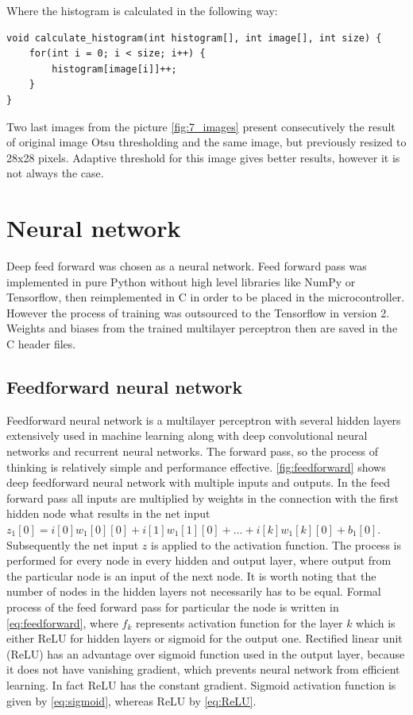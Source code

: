 Where the histogram is calculated in the following way:
\begin{verbatim}
void calculate_histogram(int histogram[], int image[], int size) {
	for(int i = 0; i < size; i++) {
		histogram[image[i]]++;
	}
}
\end{verbatim}
Two last images from the picture \ref{fig:7_images} present consecutively the result of original image Otsu thresholding and the same image, but previously resized to 28x28 pixels. Adaptive threshold for this image gives better results, however it is not always the case.
\begingroup
\renewcommand{\cleardoublepage}{}
\renewcommand{\clearpage}{}
\chapter{Neural network}
\endgroup
Deep feed forward was chosen as a neural network. Feed forward pass was implemented in pure Python without high level libraries like NumPy or Tensorflow, then reimplemented in C in order to be placed in the microcontroller. However the process of training was outsourced to the Tensorflow in version 2. Weights and biases from the trained multilayer perceptron then are saved in the C header files. 

\section{Feedforward neural network}
Feedforward neural network is a multilayer perceptron with several hidden layers extensively used in machine learning along with deep convolutional neural networks and recurrent neural networks. The forward pass, so the process of thinking is relatively simple and performance effective. \figurename{} \ref{fig:feedforward} shows deep feedforward neural network with multiple inputs and outputs. In the feed forward pass all inputs are multiplied by weights in the connection with the first hidden node what results in the net input $z_1[0]=i[0]w_1[0][0]+i[1]w_1[1][0]+\dots+i[k]w_1[k][0] + b_1[0]$. Subsequently the net input $z$ is applied to the activation function. The process is performed for every node in every hidden and output layer, where output from the particular node is an input of the next node. It is worth noting that the number of nodes in the hidden layers not necessarily has to be equal. Formal process of the feed forward pass for particular the node is written in \ref{eq:feedforward}, where $f_k$ represents activation function for the layer $k$ which is either ReLU for hidden layers or sigmoid for the output one. Rectified linear unit (ReLU) has an advantage over sigmoid function used in the output layer, because it does not have vanishing gradient, which prevents neural network from efficient learning. In fact ReLU has the constant gradient. Sigmoid activation function is given by \ref{eq:sigmoid}, whereas ReLU by \ref{eq:ReLU}.

